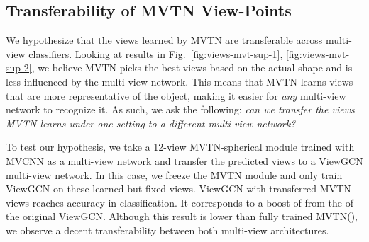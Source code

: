 \documentclass[10pt,twocolumn,letterpaper]{article}
\newcommand{\figLabel}{Fig.~}
\begin{document}
\subsection{Transferability of MVTN View-Points}
We hypothesize that the views learned by MVTN are transferable across multi-view classifiers. Looking at results in \figLabel{\ref{fig:views-mvt-sup-1}, \ref{fig:views-mvt-sup-2}}, we believe MVTN picks the best views based on the actual shape and is less influenced by the multi-view network.
This means that MVTN learns views that are more representative of the object, making it easier for \textit{any} multi-view network to recognize it.
As such, we ask the following:
\textit{can we transfer the views MVTN learns under one setting to a different multi-view network?}

To test our hypothesis, we take a 12-view MVTN-spherical module trained with MVCNN as a multi-view network and transfer the predicted views to a ViewGCN multi-view network. In this case, we freeze the MVTN module and only train ViewGCN on these learned but fixed views. ViewGCN with transferred MVTN views reaches  accuracy in classification. It corresponds to a boost of  from the  of the original ViewGCN. Although this result is lower than fully trained MVTN(), we observe a decent transferability between both multi-view architectures.
\end{document}
